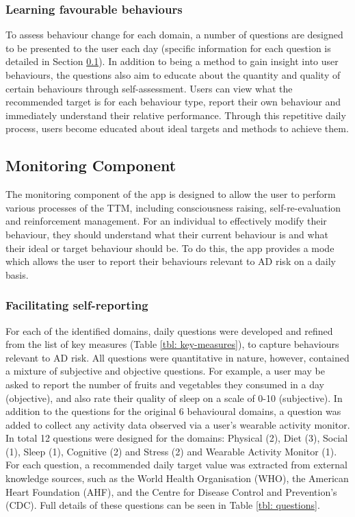 \subsubsection{Learning favourable behaviours}
To assess behaviour change for each domain, a number of questions are designed to be presented to the user each day (specific information for each question is detailed in Section \ref{subsection-montoringcomponent}). In addition to being a method to gain insight into user behaviours, the questions also aim to educate about the quantity and quality of certain behaviours through self-assessment. Users can view what the recommended target is for each behaviour type, report their own behaviour and immediately understand their relative performance. Through this repetitive daily process, users become educated about ideal targets and methods to achieve them.

\subsection{Monitoring Component} \label{subsection-montoringcomponent}
The monitoring component of the app is designed to allow the user to perform various processes of the TTM, including consciousness raising, self-re-evaluation and reinforcement management. For an individual to effectively modify their behaviour, they should understand what their current behaviour is and what their ideal or target behaviour should be. To do this, the app provides a mode which allows the user to report their behaviours relevant to AD risk on a daily basis.

\subsubsection{Facilitating self-reporting}
For each of the identified domains, daily questions were developed and refined from the list of key measures (Table \ref{tbl: key-measures}), to capture behaviours relevant to AD risk. All questions were quantitative in nature, however, contained a mixture of subjective and objective questions. For example, a user may be asked to report the number of fruits and vegetables they consumed in a day (objective), and also rate their quality of sleep on a scale of 0-10 (subjective).
In addition to the questions for the original 6 behavioural domains, a question was added to collect any activity data observed via a user's wearable activity monitor. In total 12 questions were designed for the domains: Physical (2), Diet (3), Social (1), Sleep (1), Cognitive (2) and Stress (2) and Wearable Activity Monitor (1). For each question, a recommended daily target value was extracted from external knowledge sources, such as the World Health Organisation (WHO), the American Heart Foundation (AHF), and the Centre for Disease Control and Prevention’s (CDC). Full details of these questions can be seen in Table \ref{tbl: questions}.

